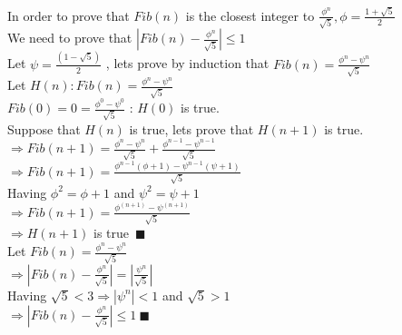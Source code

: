 \documentclass{article}
\begin{document}
\noindent In order to prove that $Fib(n)$ is the closest integer
to $\frac{\phi^n}{\sqrt{5}}, \phi = \frac{1+\sqrt{5}}{2}$\\
We need to prove that $ |Fib(n) -  \frac{\phi^n}{\sqrt{5}}| \leq 1$\\

\noindent Let $\psi = \frac{( 1 - \sqrt{5})}{2}$ , lets prove by induction that
$Fib(n) = \frac{\phi^n - \psi^n}{\sqrt{5}}$\\
Let $H(n) : Fib(n) = \frac{\phi^n - \psi^n}{\sqrt{5}}$\\
$Fib(0) = 0 = \frac{\phi^0 - \psi^0}{\sqrt{5}}$ : $H(0)$ is true.\\
Suppose that $H(n)$ is true, lets prove that $H(n+1)$ is true.\\
$\Rightarrow Fib(n+1) = \frac{\phi^n - \psi^n}{\sqrt{5}}
+ \frac{\phi^{n-1} - \psi^{n-1}}{\sqrt{5}}$\\
$\Rightarrow Fib(n+1) = \frac{\phi^{n-1}(\phi + 1) - \psi^{n-1}(\psi + 1)}{\sqrt{5}}$\\
Having $\phi^2 = \phi + 1$ and $\psi^2 = \psi + 1$\\
$\Rightarrow Fib(n+1) = \frac{\phi^{(n+1)} - \psi^{(n+1)}}{\sqrt{5}}$\\
$\Rightarrow H(n+1)$ is true\ $\blacksquare$\\

\noindent Let $Fib(n) = \frac{\phi^n - \psi^n}{\sqrt{5}}$\\
$\Rightarrow |Fib(n) - \frac{\phi^n}{\sqrt{5}}| = |\frac{\psi^n}{\sqrt{5}}|$ \\
Having $\sqrt{5} < 3 \Rightarrow |\psi^n| < 1$ and $ \sqrt{5} > 1$\\
$\Rightarrow |Fib(n) -  \frac{\phi^n}{\sqrt{5}}| \leq 1 \ \blacksquare$
\end{document}
